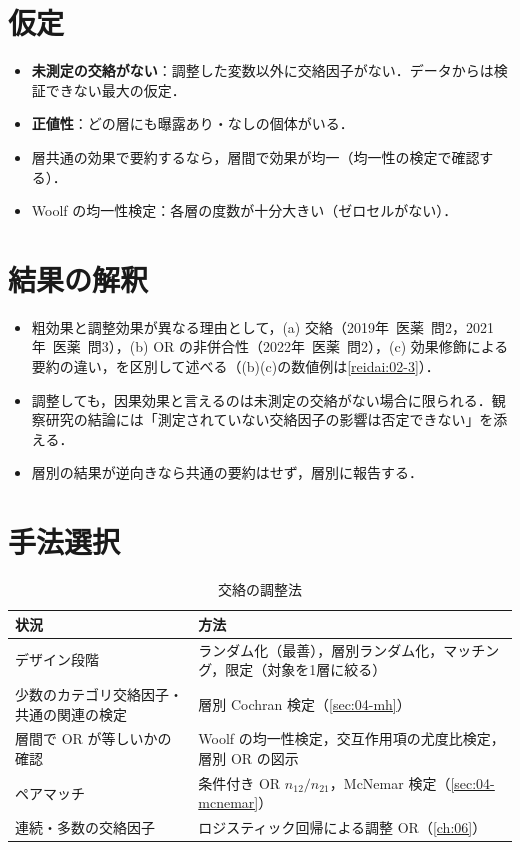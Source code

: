 \documentclass[a4paper,11pt,openany]{ltjsbook}
\newcommand{\kakomon}[2]{\mbox{#1年 医薬 問#2}}
\begin{document}
\section{仮定}\label{sec:07-assump}
\begin{itemize}
\item \textbf{未測定の交絡がない}：調整した変数以外に交絡因子がない．データからは検証できない最大の仮定．
\item \textbf{正値性}：どの層にも曝露あり・なしの個体がいる．
\item 層共通の効果で要約するなら，層間で効果が均一（均一性の検定で確認する）．
\item Woolf の均一性検定：各層の度数が十分大きい（ゼロセルがない）．
\end{itemize}

\section{結果の解釈}\label{sec:07-interp}
\begin{itemize}
\item 粗効果と調整効果が異なる理由として，(a) 交絡（\kakomon{2019}{2}，\kakomon{2021}{3}），(b) OR の非併合性（\kakomon{2022}{2}），(c) 効果修飾による要約の違い，を区別して述べる（(b)(c)の数値例は\cref{reidai:02-3}）．
\item 調整しても，因果効果と言えるのは未測定の交絡がない場合に限られる．観察研究の結論には「測定されていない交絡因子の影響は否定できない」を添える．
\item 層別の結果が逆向きなら共通の要約はせず，層別に報告する．
\end{itemize}

\section{手法選択}\label{sec:07-choice}
\begin{table}[htbp]
\centering\small
\caption{交絡の調整法}\label{tab:07-choice}
\begin{tabular}{@{}L{48mm}L{87mm}@{}}
\toprule
状況 & 方法\\
\midrule
デザイン段階 & ランダム化（最善），層別ランダム化，マッチング，限定（対象を1層に絞る）\\
少数のカテゴリ交絡因子・共通の関連の検定 & 層別 Cochran 検定（\cref{sec:04-mh}）\\
層間で OR が等しいかの確認 & Woolf の均一性検定，交互作用項の尤度比検定，層別 OR の図示\\
ペアマッチ & 条件付き OR $n_{12}/n_{21}$，McNemar 検定（\cref{sec:04-mcnemar}）\\
連続・多数の交絡因子 & ロジスティック回帰による調整 OR（\cref{ch:06}）\\
\bottomrule
\end{tabular}
\end{table}
\end{document}
